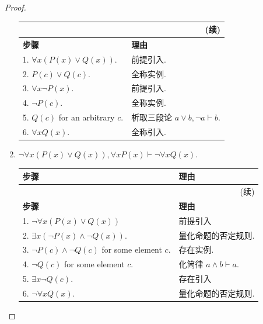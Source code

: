 \documentclass[10pt,UTF8]{book} %
\begin{document}
\begin{example}
\begin{proof}
\begin{enumerate}[itemsep=0pt, label={$\left.\arabic*\right)$}]
{\begin{longtable}{p{}p{}}
            \multicolumn{2}{r}{(续)} \\
            \toprule
            \textbf{步骤} & \textbf{理由} \\
            \midrule
            \endhead

                \bottomrule
                \endfoot 

                1. $\forall x \left( P(x) \vee Q(x) \right)$.
                    & 前提引入. \\ 
                    2. $P(c) \vee Q(c)$. & 全称实例. \\
                    3. $\forall x \lnot P(x)$. & 前提引入. \\ 
                    4. $\lnot P(c)$. & 全称实例. \\ 
                    5. $Q(c)$ for an arbitrary $c$. & 析取三段论 $a \vee b, \lnot a \vdash b$. \\ 
                    6. $\forall x Q(x)$. & 全称引入. \\
            \end{longtable}}
        
            \item $\lnot \forall x \left( P(x) \vee Q(x) \right), \forall x P(x)
            \vdash \lnot \forall x Q(x)$.
            {\begin{longtable}{p{}p{}}
                \toprule
            \textbf{步骤} & \textbf{理由} \\
            \midrule
            \endfirsthead

            \multicolumn{2}{r}{(续)} \\
            \toprule
            \textbf{步骤} & \textbf{理由} \\
            \midrule
            \endhead

                \bottomrule
                \endfoot 

                1. $\lnot \forall x \left( P(x) \vee Q(x) \right)$ & 前提引入 \\
                2. $\exists x \left( \lnot P(x) \wedge \lnot Q(x) \right)$.
                & 量化命题的否定规则. \\
                3. $\lnot P(c) \wedge \lnot Q(c)$ for some element $c$.
                & 存在实例.\\
                4. $\lnot Q(c)$ for some element $c$. & 化简律 $a \wedge b \vdash a$. \\ 
                5. $\exists x \lnot Q(c)$. & 存在引入 \\ 
                6. $\lnot \forall x Q(x)$. & 量化命题的否定规则. \\
            \end{longtable}}
        \end{enumerate}
    \end{proof}
\end{example}
\end{document}
